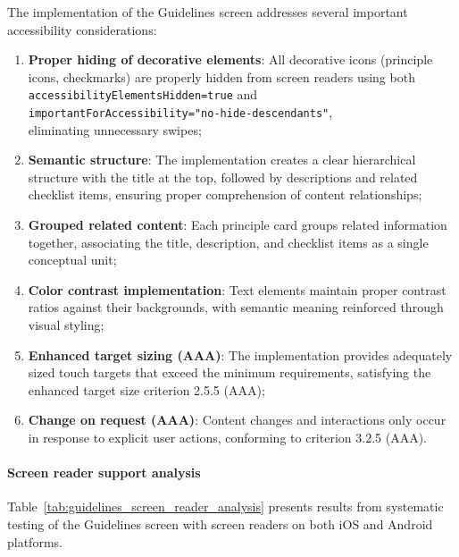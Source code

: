 \FloatBarrier

The implementation of the Guidelines screen addresses several important accessibility considerations:

\begin{enumerate}
    \item \textbf{Proper hiding of decorative elements}: All decorative icons (principle icons, checkmarks) are properly hidden from screen readers using both \\ \texttt{accessibilityElementsHidden=true} and \\ \texttt{importantForAccessibility="no-hide-descendants"}, \\ eliminating unnecessary swipes;
    
    \item \textbf{Semantic structure}: The implementation creates a clear hierarchical structure with the title at the top, followed by descriptions and related checklist items, ensuring proper comprehension of content relationships;
    
    \item \textbf{Grouped related content}: Each principle card groups related information together, associating the title, description, and checklist items as a single conceptual unit;
    
    \item \textbf{Color contrast implementation}: Text elements maintain proper contrast ratios against their backgrounds, with semantic meaning reinforced through visual styling;
    
    \item \textbf{Enhanced target sizing (AAA)}: The implementation provides adequately sized touch targets that exceed the minimum requirements, satisfying the enhanced target size criterion 2.5.5 (AAA);
    
    \item \textbf{Change on request (AAA)}: Content changes and interactions only occur in response to explicit user actions, conforming to criterion 3.2.5 (AAA).
\end{enumerate}

\paragraph{Screen reader support analysis}

Table~\ref{tab:guidelines_screen_reader_analysis} presents results from systematic testing of the Guidelines screen with screen readers on both iOS and Android platforms.


